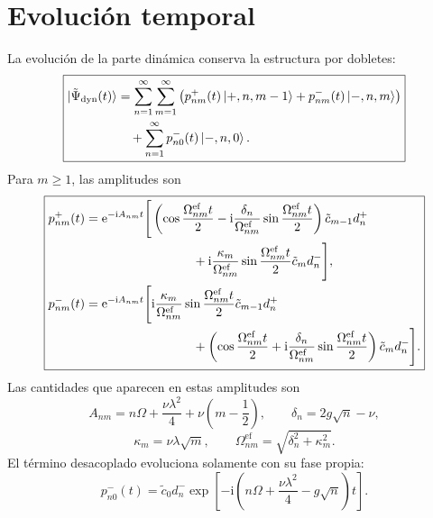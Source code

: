\documentclass[11pt]{article}
\newcommand{\ii}{\mathrm{i}}
\newcommand{\ee}{\mathrm{e}}
\begin{document}
\section{Evoluci\'on temporal}

La evoluci\'on de la parte din\'amica conserva la estructura por dobletes:
\begin{equation}
  \boxed{
  \begin{aligned}
  \ket{\tilde\Psi_{\mathrm{dyn}}(t)}
  &=
  \sum_{n=1}^{\infty}
  \sum_{m=1}^{\infty}
  \left(
  p_{nm}^{+}(t)\ket{+,n,m-1}
  +
  p_{nm}^{-}(t)\ket{-,n,m}
  \right)
  \\
  &\quad+
  \sum_{n=1}^{\infty}
  p_{n0}^{-}(t)\ket{-,n,0}.
  \end{aligned}
  }
\end{equation}
Para $m\geq1$, las amplitudes son
\begin{equation}
  \boxed{
  \begin{aligned}
  p_{nm}^{+}(t)
  &=
  \ee^{-\ii A_{nm}t}
  \Bigg[
  \left(
  \cos\frac{\Omega_{nm}^{\mathrm{ef}}t}{2}
  -
  \ii\frac{\delta_n}{\Omega_{nm}^{\mathrm{ef}}}
  \sin\frac{\Omega_{nm}^{\mathrm{ef}}t}{2}
  \right)
  \tilde c_{m-1}d_n^+
  \\
  &\hspace{3.0cm}
  +
  \ii\frac{\kappa_m}{\Omega_{nm}^{\mathrm{ef}}}
  \sin\frac{\Omega_{nm}^{\mathrm{ef}}t}{2}
  \tilde c_md_n^-
  \Bigg],
  \\
  p_{nm}^{-}(t)
  &=
  \ee^{-\ii A_{nm}t}
  \Bigg[
  \ii\frac{\kappa_m}{\Omega_{nm}^{\mathrm{ef}}}
  \sin\frac{\Omega_{nm}^{\mathrm{ef}}t}{2}
  \tilde c_{m-1}d_n^+
  \\
  &\hspace{3.0cm}
  +
  \left(
  \cos\frac{\Omega_{nm}^{\mathrm{ef}}t}{2}
  +
  \ii\frac{\delta_n}{\Omega_{nm}^{\mathrm{ef}}}
  \sin\frac{\Omega_{nm}^{\mathrm{ef}}t}{2}
  \right)
  \tilde c_md_n^-
  \Bigg].
  \end{aligned}
  }
\end{equation}
Las cantidades que aparecen en estas amplitudes son
\begin{equation}
  \boxed{
  A_{nm}
  =
  n\Omega
  +
  \frac{\nu\lambda^2}{4}
  +
  \nu\left(m-\frac12\right),
  \qquad
  \delta_n=2g\sqrt n-\nu,
  }
\end{equation}
\begin{equation}
  \boxed{
  \kappa_m=\nu\lambda\sqrt m,
  \qquad
  \Omega_{nm}^{\mathrm{ef}}
  =
  \sqrt{\delta_n^2+\kappa_m^2}.
  }
\end{equation}
El t\'ermino desacoplado evoluciona solamente con su fase propia:
\begin{equation}
  \boxed{
  p_{n0}^{-}(t)
  =
  \tilde c_0d_n^-
  \exp\left[
  -\ii
  \left(
  n\Omega+\frac{\nu\lambda^2}{4}-g\sqrt n
  \right)t
  \right].
  }
\end{equation}
\end{document}
